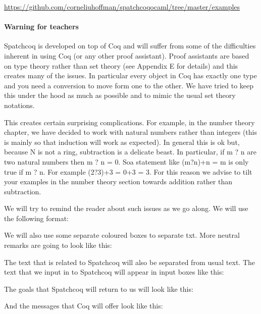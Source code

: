  \url{https://github.com/corneliuhoffman/spatchcoqocaml/tree/master/examples}
\paragraph{\bf Warning for teachers}\label{subsec:warnings}

Spatchcoq is developed on top of Coq and  will suffer from some of the difficulties inherent in using Coq (or any other proof assistant). Proof assistants are based on type theory rather than set theory (see Appendix E for details) and this creates many of the issues. In particular every object in Coq has exactly one type and you need a conversion to move form one to the other. We have tried to keep this under the hood as much as possible and to mimic the usual set theory notations.

This creates certain surprising complications. For example, in the number theory chapter, we have decided to work with natural numbers rather than integers (this is mainly so that induction will work as expected). In general this is ok but, because N is not a ring, subtraction is a delicate beast. In particular, if m ? n are two natural numbers then m ? n = 0. Soa statement like (m?n)+n = m is only true if m ? n. For example (2?3)+3 = 0+3 = 3. For this reason we advise to tilt your examples in the number theory section towards addition rather than
subtraction. 

We will try to remind the reader about such issues as we go along. We will use the following format:

We will also use some separate coloured boxes to separate txt. More neutral remarks are going to look like this:


The text that is related to Spatchcoq will also be separated from usual text. The text that we input in to Spatchcoq will appear in input boxes like this:

The goals that Spatchcoq will return to us will look like this:

And the messages that Coq will offer look like this:



 

